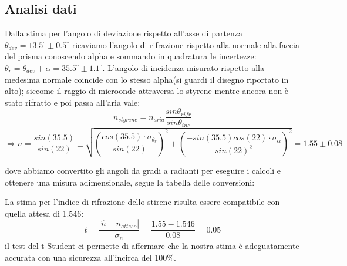 \documentclass{article}
\theoremstyle{definition}
\begin{document}
\subsection{Analisi dati}

Dalla stima per l'angolo di deviazione rispetto all'asse di partenza \( \theta_{dev}=13.5 ^{\circ}\pm 0.5 ^{\circ}\) ricaviamo l'angolo di rifrazione rispetto alla normale alla faccia del prisma conoscendo alpha e sommando in quadratura le incertezze:\\ \(\theta_{r} = \theta_{dev} + \alpha = 35.5  ^{\circ}\pm 1.1 ^{\circ}\). L'angolo di incidenza misurato rispetto alla medesima normale coincide con lo stesso alpha(si guardi il disegno riportato in alto); siccome il raggio di microonde attraversa lo styrene mentre ancora non è stato rifratto e poi passa all'aria vale:
\[n_{styrene} = n_{aria}\frac{sin\theta_{rifr}}{sin\theta_{inc}}\]
\[\Rightarrow n = \frac{sin(35.5)}{sin(22)} \pm \sqrt{ \left(\frac{cos(35.5) \cdot \sigma_{\theta_r}}{sin(22)}\right)^{2} + \left(\frac{-sin(35.5) cos(22)\cdot \sigma_{\alpha}}{sin(22)^{2}}\right)^{2}  }= 1.55 \pm 0.08  \] 

dove abbiamo convertito gli angoli da gradi a radianti per eseguire i calcoli e ottenere una misura adimensionale, segue la tabella delle conversioni:


\begin{figure}[!htbp]
    	\captionsetup{labelformat=empty}

\end{figure}

\noindent La stima per l'indice di rifrazione dello stirene risulta essere compatibile con quella attesa di 1.546:
\[ t = \frac{\left |\hat{n} - n_{atteso} \right|}{\sigma_n} = \frac{1.55 - 1.546}{0.08} = 0.05\]
il test del t-Student ci permette di affermare che la nostra stima è adeguatamente accurata con una sicurezza all'incirca del 100\%. 
\end{document}

